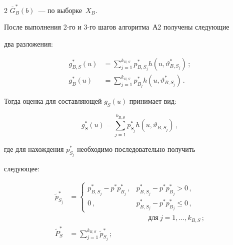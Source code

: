 \begin{multicols}{2}
$\overline{G}_B^*(b)$~--- по выборке~$X_B$.


     


     После выполнения 2-го и 3-го шагов алгоритма~А2 получены следующие 


два разложения:


     \begin{align*}


     g_{B,S}^* (u) & = \sum\limits_{j=1}^{k_{B,S}}p_{B,S_j}^* h\left (u, 


\vartheta_{B,S_j}^*\right )\,;\\


     g_{B}^* (u) & = \sum\limits_{j=1}^{k_{B,S}}p_{B_j}^* h\left (u, 


\vartheta_{B,S_j}^*\right )\,.


     \end{align*}





Тогда оценка для составляющей $g_S(u)$ принимает вид:


$$


g_S^*(u) = \sum\limits_{j=1}^{k_{B,S}}p_{S_j}^* h(u,\vartheta_{B,S_j})\,,


$$


где для нахождения  $p_{S_j}^*$ необходимо последовательно получить 


следующее:


\begin{align*}


\widetilde{p}_{S_j}^* & =


\begin{cases}


p_{B,S_j}^* -p^* p_{B_j}^*\,, & p_{B,S_j}^*-p^* p_{B_j}^* >0\,,\\


0\,, & p_{B,S_j}^* - p^* p_{B_j}^*\leq 0\,,


\end{cases} \\


&\ \ \ \ \ \ \ \ \ \ \ \ \ \ \ \ \ 


\ \ \ \ \ \ \ \ \ \ \ \ \ \ \ \ \ \ \ \ \ \ \ \ \ \ \ \ \ \ \ \ \ \ 


\mbox{для}\ j=1,\ldots ,k_{B,S}\,;\\


\widetilde{P}_S^* & = \sum\limits_{j=1}^{k_{B,S}}\widetilde{p}_{S_j}^*\,;\\



\end{align*}
\end{multicols}
